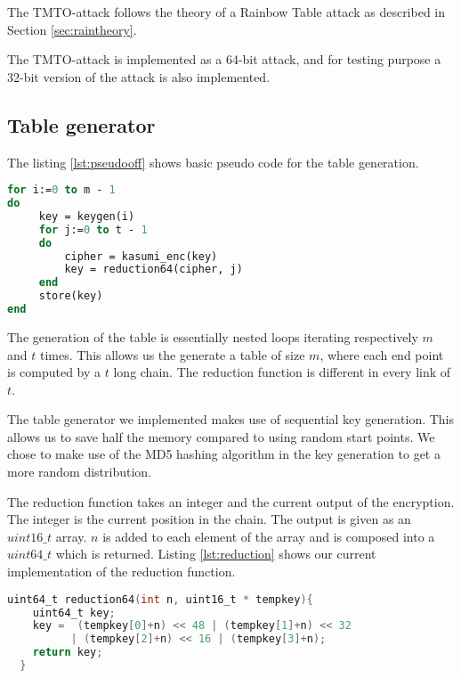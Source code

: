 The TMTO-attack follows the theory of a Rainbow Table attack as
described in Section \ref{sec:raintheory}.

The TMTO-attack is implemented as a 64-bit attack, and for testing
purpose a 32-bit version of the attack is also implemented.

\subsection{Table generator}
% 
The listing \ref{lst:pseudooff} shows basic pseudo code for the table generation.

\begin{lstlisting}[frame=single, language=Pascal, mathescape,
captionpos=b, caption={Pseudo code for table generation}, label={lst:pseudooff}]
for i:=0 to m - 1
do
     key = keygen(i)
     for j:=0 to t - 1
     do
         cipher = kasumi_enc(key)
         key = reduction64(cipher, j)
     end
     store(key)
end
\end{lstlisting}
The generation of the table is essentially nested  loops iterating
respectively $m$ and $t$ times. This allows us the generate a table of
size $m$, where each end point is computed by a $t$ long chain. The
reduction function is different in every link of $t$. 

The table generator we implemented makes use of sequential key
generation. This allows us to save half the memory compared to using
random start points. We chose to make use of the MD5 hashing algorithm
in the key generation to get a more random distribution. 

The reduction function takes an integer and the current output of the encryption. The
integer is the current position in the chain. The output is given as an
$uint16\_t$ array. $n$ is added to each element of the array and is composed 
into a $uint64\_t$ which is returned. Listing \ref{lst:reduction}
shows our current implementation of the reduction function.

\begin{lstlisting}[frame=single, language=C, mathescape,
captionpos=b, caption={Example reduction function}, label={lst:reduction}]
uint64_t reduction64(int n, uint16_t * tempkey){
    uint64_t key;
    key =  (tempkey[0]+n) << 48 | (tempkey[1]+n) << 32 
          | (tempkey[2]+n) << 16 | (tempkey[3]+n);
    return key;
  }
\end{lstlisting}

